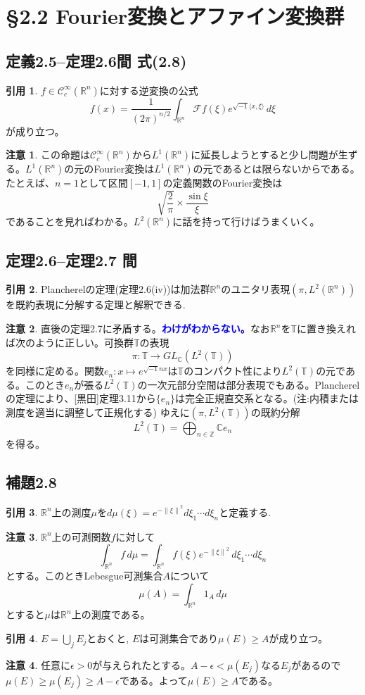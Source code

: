 \documentclass[12pt]{jsarticle}
\newcommand{\R}{\mathbb{R}}
\newcommand{\Z}{\mathbb{Z}}
\newcommand{\C}{\mathbb{C}}
\newcommand{\T}{\mathbb{T}}%
\newcommand{\F}{\mathcal{F}}
\newcommand{\CCIX}[1]{\mathcal{C}_c^{\infty}(#1)}
\newcommand{\textblue}[1]{\textcolor{blue}{\textbf{#1}}}
\newcommand{\I}{\sqrt{-1}}%
\newcommand{\norm}[1]{\left \lVert #1 \right \rVert}%
\newcommand{\inprod}[2]{\langle #1 , #2 \rangle}%
\theoremstyle{definition}%
\newtheorem*{rem}{注意}
\newtheorem*{quo}{引用}%
\renewenvironment{leftbar}{%
  \renewcommand\FrameCommand{\vrule width 1pt \hspace{10pt}}%
  \MakeFramed {\advance\hsize-\width \FrameRestore}}%
 {\endMakeFramed}
\newcommand{\barquo}[1]{\begin{leftbar} \begin{quo}  #1 \end{quo} \end{leftbar}}
\newcommand{\bfsubsection}[1]{\subsection*{\textbf{#1}}}
\begin{document}
\section*{\S 2.2 Fourier変換とアファイン変換群}
\bfsubsection{定義2.5--定理2.6間 式(2.8)}
\barquo{
$f \in \CCIX{\R^n}$に対する逆変換の公式
\[
f(x) = \frac{1}{(2\pi)^{n/2}} \int_{\R^n} \F f(\xi)e^{\I \inprod{x}{\xi}} \, d\xi
\]
が成り立つ。
}
\begin{rem}
  この命題は$\CCIX{\R^n}$から$L^1(\R^n)$に延長しようとすると少し問題が生ずる。$L^1(\R^n)$の元のFourier変換は$L^1(\R^n)$の元であるとは限らないからである。たとえば、$n=1$として区間$[-1,1]$の定義関数のFourier変換は
  \[
  \sqrt{\frac{2}{\pi}} \times \frac{\sin \xi}{\xi}
  \]
  であることを見ればわかる。$L^2(\R^n)$に話を持って行けばうまくいく。
\end{rem}

\newpage
\bfsubsection{定理2.6--定理2.7 間}
\barquo{
Plancherelの定理(定理2.6(iv))は加法群$\R^n$のユニタリ表現$(\pi,L^2(\R^n))$を既約表現に分解する定理と解釈できる.
}
\begin{rem}
  直後の定理2.7に矛盾する。\textblue{わけがわからない。}なお$\R^n$を$\T$に置き換えれば次のように正しい。可換群$\T$の表現
  \[
  \pi \colon \T \to GL_{\C}(L^2(\T))
  \]
  を同様に定める。関数$e_n \colon x \mapsto e^{\I nx}$は$\T$のコンパクト性により$L^2(\T)$の元である。このとき$e_n$が張る$L^2(\T)$の一次元部分空間は部分表現でもある。Plancherelの定理により、[黒田]\cite{黒田}定理3.11から$\{ e_n \}$は完全正規直交系となる。(注:内積または測度を適当に調整して正規化する) ゆえに$(\pi,L^2(\T))$の既約分解
  \[
  L^2(\T) = \bigoplus_{n \in \Z} \C e_n
  \]
  を得る。
\end{rem}


\bfsubsection{補題2.8}
\barquo{
$\R^n$上の測度$\mu$を$d\mu(\xi)=e^{-\norm{\xi}^2}d\xi_1 \cdots d\xi_n$と定義する.
}
\begin{rem}
  $\R^n$上の可測関数$f$に対して
  \[
  \int_{\R^n} f \, d\mu = \int_{\R^n} f(\xi) e^{-\norm{\xi}^2} \, d\xi_1 \cdots d\xi_n
  \]
  とする。このときLebesgue可測集合$A$について
  \[
  \mu(A)=\int_{\R^n} 1_{A} \, d\mu
  \]
  とすると$\mu$は$\R^n$上の測度である。
\end{rem}



\barquo{
$E = \bigcup_j E_j$とおくと, $E$は可測集合であり$\mu (E) \geq A$が成り立つ。
}
\begin{rem}
  任意に$\epsilon > 0$が与えられたとする。$A- \epsilon < \mu(E_j)$なる$E_j$があるので$\mu (E) \geq \mu(E_j) \geq A- \epsilon$である。よって$\mu(E) \geq A$である。
\end{rem}
\end{document}
